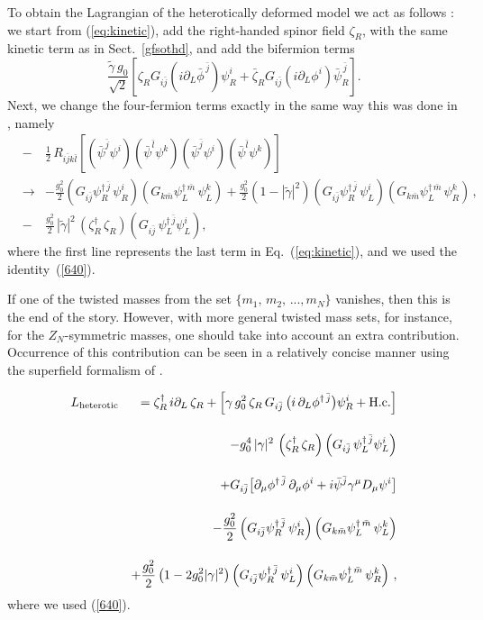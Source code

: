 \documentclass[epsfig,12pt]{article}
\def\beq{\begin{equation}}
\def\eeq{\end{equation}}
\def\beqn{\begin{eqnarray}}
\def\eeqn{\end{eqnarray}}
\newcommand{\pt}{\partial}
\newcommand{\zn}{$Z_N$}
\def\beqn{\begin{eqnarray}}
\def\eeqn{\end{eqnarray}}
\def\beq{\begin{equation}}
\def\eeq{\end{equation}}
\begin{document}
To obtain the Lagrangian of the heterotically deformed model
we act as follows \cite{BSY3}: we start from (\ref{eq:kinetic}), add the
 right-handed spinor field $\zeta_R$, with the same kinetic term as in Sect.~\ref{gfsothd}, and
 add the bifermion terms
 \beq
 \frac{\tilde\gamma \,g_0}{\sqrt 2}
 \left[\zeta_RG_{i\bar j}\left(i\pt_L\bar\phi^{\,\bar j}
 \right)\psi_R^i + \bar\zeta_R G_{i\bar j}\left(i\pt_L\phi^{i}
 \right)\bar\psi_R^{\,\bar j} 
 \right].
 \eeq
Next, we change the four-fermion terms exactly in the same way this was done in
 \cite{SY1},
 namely
 \beqn
&-&\frac{1}{2} \,R_{i\bar jk\bar l}\left[\left(\bar\psi^{\bar j}\psi^{i}\right)\left(\bar\psi^{\bar l}\psi^{k}\right)
\left(\bar\psi^{\bar j}\psi^{i}\right)\left(\bar\psi^{\bar l}\psi^{k}\right)
\right]
\nonumber\\[3mm]
&\to&
- \frac{g_0^2}{2}\left( G_{i\bar j}\psi^{\dagger\, \bar j}_R\, \psi^{ i}_R\right)
\left( G_{k\bar m}\psi^{\dagger\, \bar m}_L\, \psi^{ k}_L\right)+
\frac{g_0^2}{2}\left(1-|\tilde\gamma|^2\right)
\left( G_{i\bar j}\psi^{\dagger\, \bar j}_R\, \psi^{ i}_L\right)
\left( G_{k\bar m}\psi^{\dagger\, \bar m}_L\, \psi^{ k}_R\right)\,,
\nonumber
\\[4mm]
&-&
 \frac{g_0^2}{2} \, |\tilde{\gamma} |^2 \,\left(\zeta_R^\dagger\, \zeta_R
\right)\left(G_{i\bar j}\,  \psi_L^{\dagger\,\bar j}\psi_L^i\right),
\eeqn
 where the first line represents the last term in Eq.~(\ref{eq:kinetic}), and we used the identity~(\ref{640}).
 
 
  If one of the twisted masses from the set  $\{m_1,\,m_2,\, ..., m_N\}$ vanishes,
then this is the end of the story. However, with more general twisted mass sets,
for instance, for the \zn-symmetric masses, one should take into account an extra contribution.
Occurrence of this contribution can be seen in a relatively concise
manner using the superfield formalism of \cite{SY1}. 
 
\beqn
L_{{\rm heterotic}} && 
= 
\zeta_R^\dagger \, i\partial_L \, \zeta_R  + 
\left[\gamma\, g_0^2 \, \zeta_R  \, G_{i\bar j}\,  \big( i\,\partial_{L}\phi^{\dagger\,\bar j} \big)\psi_R^i
+{\rm H.c.}\right]
\nonumber
\\[4mm]
&&
 -g_0^4\, |\gamma |^2 \,\left(\zeta_R^\dagger\, \zeta_R
\right)\left(G_{i\bar j}\,  \psi_L^{\dagger\,\bar j}\psi_L^i\right)
\nonumber
\\[4mm]
&&
+G_{i\bar j} \big[\partial_\mu \phi^{\dagger\,\bar j}\, \partial_\mu\phi^{i}
+i\bar \psi^{\bar j} \gamma^{\mu} D_{\mu}\psi^{i}\big]
\nonumber
\\[4mm]
&&
- \frac{g_0^2}{2}\left( G_{i\bar j}\psi^{\dagger\, \bar j}_R\, \psi^{ i}_R\right)
\left( G_{k\bar m}\psi^{\dagger\, \bar m}_L\, \psi^{ k}_L\right)
\nonumber
\\[4mm]
&&
+\frac{g_0^2}{2}\left(1-2g^2_0|\gamma|^2\right)
\left( G_{i\bar j}\psi^{\dagger\, \bar j}_R\, \psi^{ i}_L\right)
\left( G_{k\bar m}\psi^{\dagger\, \bar m}_L\, \psi^{ k}_R\right)\,,
\label{cpn-1g}
\eeqn
where we used (\ref{640}).
\end{document}

